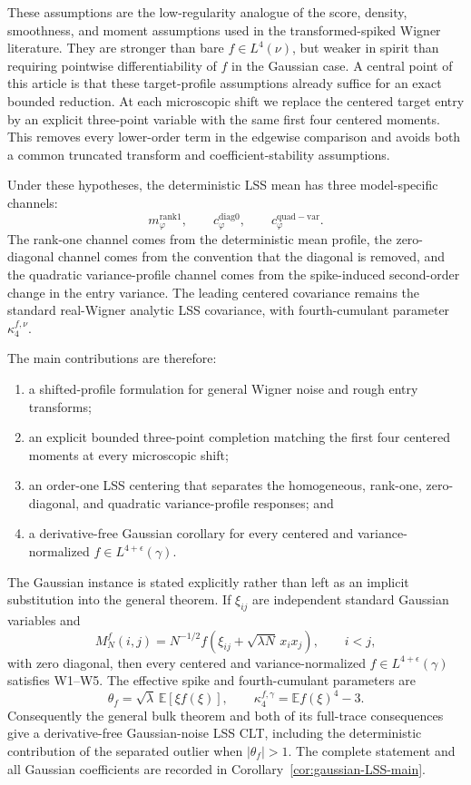 \documentclass[11pt]{article}
\theoremstyle{definition}
\theoremstyle{remark}
\newcommand{\E}{\mathbb E}
\begin{document}
These assumptions are the low-regularity analogue of the score, density, smoothness, and moment assumptions used in the transformed-spiked Wigner literature.  They are stronger than bare \(f\in L^4(\nu)\), but weaker in spirit than requiring pointwise differentiability of \(f\) in the Gaussian case.  A central point of this article is that these target-profile assumptions already suffice for an exact bounded reduction.  At each microscopic shift we replace the centered target entry by an explicit three-point variable with the same first four centered moments.  This removes every lower-order term in the edgewise comparison and avoids both a common truncated transform and coefficient-stability assumptions.

Under these hypotheses, the deterministic LSS mean has three model-specific channels:
\[
        m_\varphi^{\mathrm{rank1}},\qquad
        c_\varphi^{\mathrm{diag0}},\qquad
        c_\varphi^{\mathrm{quad-var}}.
\]
The rank-one channel comes from the deterministic mean profile, the zero-diagonal channel comes from the convention that the diagonal is removed, and the quadratic variance-profile channel comes from the spike-induced second-order change in the entry variance.  The leading centered covariance remains the standard real-Wigner analytic LSS covariance, with fourth-cumulant parameter \(\kappa_4^{f,\nu}\).

The main contributions are therefore:
\begin{enumerate}[label=(\roman*),leftmargin=2.5em]
\item a shifted-profile formulation for general Wigner noise and rough entry
transforms;
\item an explicit bounded three-point completion matching the first four
centered moments at every microscopic shift;
\item an order-one LSS centering that separates the homogeneous, rank-one,
zero-diagonal, and quadratic variance-profile responses; and
\item a derivative-free Gaussian corollary for every centered and
variance-normalized $f\in L^{4+\epsilon}(\gamma)$.
\end{enumerate}

The Gaussian instance is stated explicitly rather than left as an implicit
substitution into the general theorem.  If \(\xi_{ij}\) are independent
standard Gaussian variables and
\[
 M_N^f(i,j)=N^{-1/2}f\!\left(\xi_{ij}+\sqrt{\lambda N}\,x_ix_j\right),
 \qquad i<j,
\]
with zero diagonal, then every centered and variance-normalized
\(f\in L^{4+\epsilon}(\gamma)\) satisfies W1--W5.  The effective spike and
fourth-cumulant parameters are
\[
 \theta_f=\sqrt\lambda\,\E[\xi f(\xi)],
 \qquad
 \kappa_4^{f,\gamma}=\E f(\xi)^4-3.
\]
Consequently the general bulk theorem and both of its full-trace consequences
give a derivative-free Gaussian-noise LSS CLT, including the deterministic
contribution of the separated outlier when \(|\theta_f|>1\).  The complete
statement and all Gaussian coefficients are recorded in
Corollary~\ref{cor:gaussian-LSS-main}.
\end{document}
